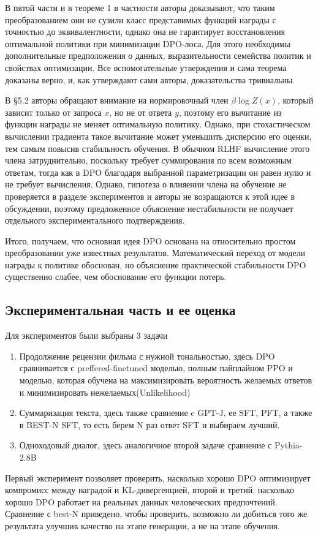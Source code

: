 \documentclass[11pt,a4paper]{article}
\theoremstyle{remark}
\begin{document}
В пятой части и в теореме 1 в частности авторы доказывают, что таким преобразованием они не сузили класс представимых функций награды с точностью до эквивалентности, однако она не гарантирует восстановления оптимальной политики при минимизации DPO-лоса. Для этого необходимы дополнительные предположения о данных, выразительности семейства политик и свойствах оптимизации.
Все вспомогательные утверждения и сама теорема доказаны верно, и, как утверждают сами авторы, доказательства тривиальны.

В \S 5.2 авторы обращают внимание на нормировочный член $\beta\log Z(x)$, который зависит только от запроса $x$, но не от ответа $y$, поэтому его вычитание из функции награды не меняет оптимальную политику. Однако, при стохастическом вычислении градиента такое вычитание может уменьшить дисперсию его оценки, тем самым повысив стабильность обучения. В обычном RLHF вычисление этого члена затруднительно, поскольку требует суммирования по всем возможным ответам, тогда как в DPO благодаря выбранной параметризации он равен нулю и не требует вычисления.
Однако, гипотеза о влияении члена на обучение не проверяется в разделе экспериментов и авторы не возращаются к этой идее в обсуждении, поэтому предложенное объяснение нестабильности не получает отдельного экспериментального подтверждения.

Итого, получаем, что основная идея DPO основана на относительно простом преобразовании уже известных результатов. Математический переход от модели награды к политике обоснован, но объяснение практической стабильности DPO существенно слабее, чем обоснование его функции потерь.

\subsection{Экспериментальная часть и ее оценка}
Для экспериментов были выбраны 3 задачи
\begin{enumerate}
    \item Продолжение рецензии фильма с нужной тональностью, здесь DPO сравнивается с preffered-finetuned моделью, полным пайплайном PPO и моделью, которая обучена на максимизировать вероятность желаемых ответов и минимизировать нежелаемых(Unlikelihood)
    \item Суммаризация текста, здесь также сравнение c GPT-J, ее SFT, PFT, а также в BEST-N SFT, то есть берем N раз ответ SFT и выбираем лучший.
    \item Одноходовый диалог, здесь аналогичное второй задаче сравнение с Pythia-2.8B
\end{enumerate}
Первый эксперимент позволяет проверить, насколько хорошо DPO оптимизирует компромисс между наградой и KL-дивергенцией, второй и третий, насколько хорошо DPO работает на реальных данных человеческих предпочтений.
Сравнение с best-N приведено, чтобы проверить, возможно ли добиться того же результата улучшив качество на этапе генерации, а не на этапе обучения.
\end{document}
